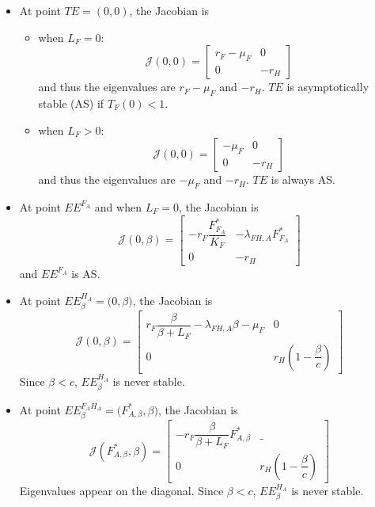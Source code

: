 \documentclass{article}
\newcommand{\lfa}{\lambda_{FH, A}}
\begin{document}
\begin{itemize}
\item At point $TE = (0, 0)$, the Jacobian is
\begin{itemize}
\item when $L_F = 0$:
\begin{equation}
\mathcal{J}(0,0) = \begin{bmatrix}
r_F-\mu_F & 0 \\
0 & -r_H
\end{bmatrix}
\end{equation}
and thus the eigenvalues are $r_F-\mu_F$ and $-r_H$. $TE$ is asymptotically stable (AS) if $T_F(0) < 1$.
\item when $L_F >0$:
\begin{equation}
\mathcal{J}(0,0) = \begin{bmatrix}
-\mu_F & 0 \\
0 & -r_H
\end{bmatrix}
\end{equation}
and thus the eigenvalues are $-\mu_F$ and $-r_H$. $TE$ is always AS.
\end{itemize}

\item At point $EE^{F_A}$ and when $L_F = 0$, the Jacobian is
\begin{equation}
\mathcal{J}(0, \beta) = \begin{bmatrix}
-r_F\dfrac{F_{F_A}^*}{K_F}& - \lfa F^*_{F_A}\\
0 & -r_H
\end{bmatrix}
\end{equation}
and $EE^{F_A}$ is AS.

\item At point $EE^{H_A}_\beta = \Big(0,\beta \Big)$, the Jacobian is
\begin{equation}
\mathcal{J}(0, \beta) = \begin{bmatrix}
r_F\dfrac{\beta}{\beta+L_F} - \lfa \beta - \mu_F & 0 \\
0 & r_H (1 - \dfrac{\beta}{c})
\end{bmatrix}
\end{equation}
Since $\beta < c$, $EE^{H_A}_\beta$ is never stable.

\item At point $EE^{F_AH_A}_\beta = \Big(F^*_{A,\beta},\beta \Big)$, the Jacobian is
\begin{equation}
\mathcal{J}(F^*_{A,\beta}, \beta) = \begin{bmatrix}
- r_F\dfrac{\beta}{\beta+L_F} F^*_{A,\beta} & \_ \\
0 & r_H (1 - \dfrac{\beta}{c})
\end{bmatrix}
\end{equation}
Eigenvalues appear on the diagonal. Since $\beta < c$, $EE^{H_A}_\beta$ is never stable.



\end{itemize}
\end{document}
